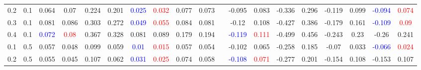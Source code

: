 \documentclass[specialist,
substylefile = spbu_report.rtx,
subf,href,colorlinks=true, 12pt]{disser}
\theoremstyle{definition}
\begin{document}
\begin{table}
{\begin{tabular}{m{1cm}m{1cm}ccccccccm{0.2cm}cccccccc}
			0.2 & 0.1    & 0.064                                   & 0.07                                       & 0.224                               & 0.201                       & \textcolor{blue}{0.025} & \textcolor{red}{0.032}                  & 0.077                                      & 0.073                    &                             & -0.095                   & 0.083                  & -0.336                   & 0.296      & -0.119                   & 0.099                   & \textcolor{blue}{-0.094} & \textcolor{red}{0.074} \\
			0.3 & 0.1    & 0.081                                   & 0.086                                      & 0.303                               & 0.272                       & \textcolor{blue}{0.049} & \textcolor{red}{0.055}                  & 0.084                                      & 0.081                    &                             & -0.12                    & 0.108                  & -0.427                   & 0.386      & -0.179                   & 0.161                   & \textcolor{blue}{-0.109} & \textcolor{red}{0.09}  \\
			0.4 & 0.1    & \textcolor{blue}{0.072}                 & \textcolor{red}{0.08}                      & 0.367                               & 0.328                       & 0.081                   & 0.089                                   & 0.179                                      & 0.194                    &                             & \textcolor{blue}{-0.119} & \textcolor{red}{0.111} & -0.499                   & 0.456      & -0.243                   & 0.23                    & -0.26                    & 0.241                  \\
			\hline
			0.1 & 0.5    & 0.057                                   & 0.048                                      & 0.099                               & 0.059                       & \textcolor{blue}{0.01}  & \textcolor{red}{0.015}                  & 0.057                                      & 0.054                    &                             & -0.102                   & 0.065                  & -0.258                   & 0.185      & -0.07                    & 0.033                   & \textcolor{blue}{-0.066} & \textcolor{red}{0.024} \\
			0.2 & 0.5    & 0.055                                   & 0.045                                      & 0.107                               & 0.062                       & \textcolor{blue}{0.031} & \textcolor{red}{0.025}                  & 0.074                                      & 0.058                    &                             & \textcolor{blue}{-0.108} & \textcolor{red}{0.071} & -0.277                   & 0.201      & -0.154                   & 0.108                   & -0.153                   & 0.107                  \\

\end{tabular}}
\end{table}
\end{document}
